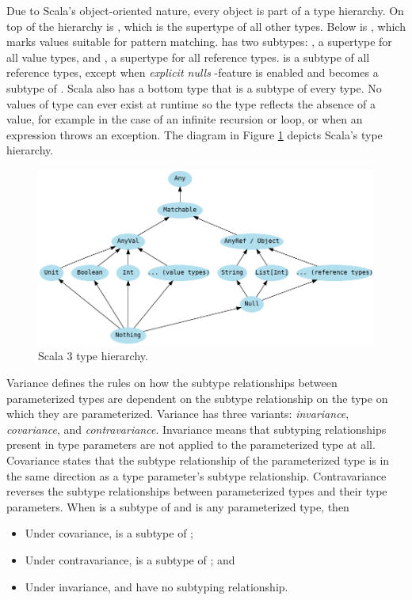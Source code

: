 

Due to Scala's object-oriented nature, every object is part of a type hierarchy. On top of the hierarchy is , which is the supertype of all other types. Below  is , which marks values suitable for pattern matching.  has two subtypes: , a supertype for all value types, and , a supertype for all reference types.  is a subtype of all reference types, except when \emph{explicit nulls} -feature is enabled and  becomes a subtype of . Scala also has a bottom type  that is a subtype of every type. No values of type  can ever exist at runtime so the type reflects the absence of a value, for example in the case of an infinite recursion or loop, or when an expression throws an exception. The diagram in Figure \ref{fig:scala-type-hierarchy} depicts Scala's type hierarchy.

\begin{figure}
    \centering
    \includegraphics[width=\textwidth]{images/type-hierarchy}
    \caption{Scala 3 type hierarchy.}
    \label{fig:scala-type-hierarchy}
\end{figure}

Variance defines the rules on how the subtype relationships between parameterized types are dependent on the subtype relationship on the type on which they are parameterized. Variance has three variants: \emph{invariance}, \emph{covariance}, and \emph{contravariance}. Invariance means that subtyping relationships present in type parameters are not applied to the parameterized type at all. Covariance states that the subtype relationship of the parameterized type is in the same direction as a type parameter's subtype relationship. Contravariance reverses the subtype relationships between parameterized types and their type parameters. When  is a subtype of  and  is any parameterized type, then
\begin{itemize}
    \item Under covariance,  is a subtype of ;
    \item Under contravariance,  is a subtype of ; and
    \item Under invariance,  and  have no subtyping relationship.
\end{itemize}

